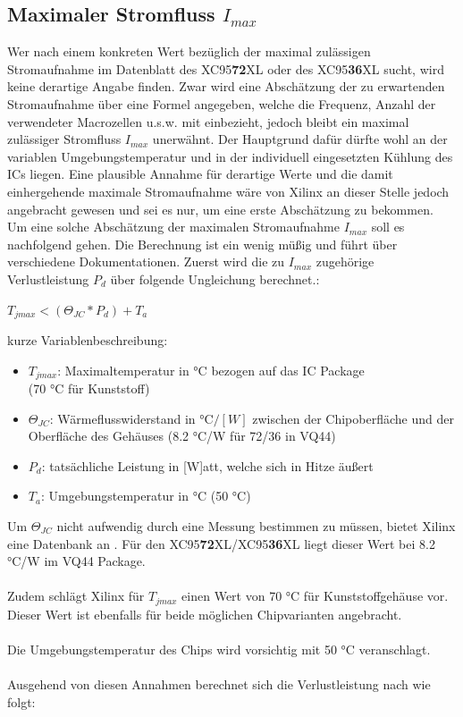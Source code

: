 \documentclass{article}
\begin{document}
{\subsection{Maximaler Stromfluss $I_{max}$}
\label{sec:max_I}
Wer nach einem konkreten Wert bezüglich der maximal zulässigen Stromaufnahme im Datenblatt \autocite{XC95_Spec} des XC95\textbf{72}XL oder des XC95\textbf{36}XL sucht, wird keine derartige Angabe finden.
Zwar wird eine Abschätzung der zu erwartenden Stromaufnahme über eine Formel angegeben, welche die Frequenz, Anzahl der verwendeter Macrozellen u.s.w. mit einbezieht, jedoch bleibt ein maximal zulässiger Stromfluss $I_{max}$ unerwähnt. Der Hauptgrund dafür dürfte wohl an der variablen Umgebungstemperatur und in der individuell eingesetzten Kühlung des ICs liegen. Eine plausible Annahme für derartige Werte und die damit einhergehende maximale Stromaufnahme wäre von Xilinx an dieser Stelle jedoch angebracht gewesen und sei es nur, um eine erste Abschätzung zu bekommen.\\

Um eine solche Abschätzung der maximalen Stromaufnahme $I_{max}$ soll es nachfolgend gehen. Die Berechnung ist ein wenig müßig und führt über verschiedene Dokumentationen.
Zuerst wird die zu $I_{max}$ zugehörige Verlustleistung $P_d$ über folgende Ungleichung berechnet.\autocite[16]{XC95_maxI}: 
\begin{center}
	$T_{jmax} < (\Theta_{JC}*P_d)+T_a$
\end{center}

kurze Variablenbeschreibung:

\begin{itemize}
	\item $T_{jmax}$: Maximaltemperatur in \si{\celsius} bezogen auf das IC Package \\(70 \si{\celsius} für Kunststoff) \autocite[54]{Device_pkg}
	\item $\Theta_{JC}$: Wärmeflusswiderstand in $\si{\celsius}/[W]$ zwischen der Chipoberfläche und der Oberfläche des Gehäuses \autocite[53]{Device_pkg} (8.2 \si{\celsius}/W für 72/36 in VQ44)
	\item $P_d$: tatsächliche Leistung in [W]att, welche sich in Hitze äußert \autocite[16]{XC95_maxI}
	\item $T_a$: Umgebungstemperatur in \si{\celsius} (50 \si{\celsius})
\end{itemize}

Um $\Theta_{JC}$ nicht aufwendig durch eine Messung bestimmen zu müssen, bietet Xilinx eine Datenbank an \autocite{ThetaJC}. Für den XC95\textbf{72}XL/XC95\textbf{36}XL liegt dieser Wert bei 8.2 \si{\celsius}/W im VQ44 Package.\\\\
Zudem schlägt Xilinx für $T_{jmax}$ einen Wert von 70 \si{\celsius} für Kunststoffgehäuse vor. Dieser Wert ist ebenfalls für beide möglichen Chipvarianten angebracht.\\\\
Die Umgebungstemperatur des Chips wird vorsichtig mit 50 \si{\celsius} veranschlagt.\\\\
Ausgehend von diesen Annahmen berechnet sich die Verlustleistung nach \autocite[16]{XC95_maxI} wie folgt:

}
\end{document}
